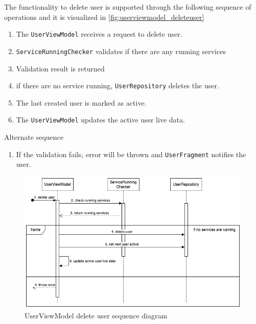 The functionality to delete user is supported through the following sequence of operations and it is visualized in \autoref{fig:userviewmodel_deleteuser}

\begin{enumerate}
    \item The \texttt{UserViewModel} receives a request to delete user.
    \item \texttt{ServiceRunningChecker} validates if there are any running services
    \item Validation result is returned
    \item if there are no service running, \texttt{UserRepository} deletes the user.
    \item The last created user is marked as active.
    \item The \texttt{UserViewModel} updates the active user live data.
\end{enumerate}

Alternate sequence
\begin{enumerate}[start=4]
    \item If the validation fails, error will be thrown and \texttt{UserFragment} notifies the user.
\end{enumerate}

\begin{figure}[H]
    \centering
    \includegraphics[width=1\textwidth]{diagrams/delete-user-vm.drawio.png}
    \caption{UserViewModel delete user sequence diagram}
    \label{fig:userviewmodel_deleteuser}
\end{figure}

